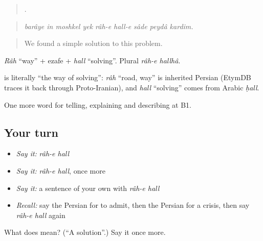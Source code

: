 \begin{quote}
        .
\end{quote}

\begin{quote}
\emph{barâye in moshkel yek râh-e hall-e sâde peydâ kardim.}
\end{quote}

\begin{quote}
We found a simple solution to this problem.
\end{quote}

\emph{Râh} \textquotedblleft{}way\textquotedblright{} + ezafe + \emph{hall} \textquotedblleft{}solving\textquotedblright{}. Plural \emph{râh-e hallhâ}.

\begin{cousinweb}
\textbf{ } is literally \textquotedblleft{}the way of solving\textquotedblright{}: \emph{râh} \textquotedblleft{}road, way\textquotedblright{} is inherited Persian (EtymDB traces it back through Proto-Iranian), and \emph{hall} \textquotedblleft{}solving\textquotedblright{} comes from Arabic \emph{ḥall}.
\end{cousinweb}

\begin{grammarlens}[title={What you've built}]
One more word for telling, explaining and describing at B1.
\end{grammarlens}

\subsection*{Your turn}
\begin{itemize}
\raggedright
  \item \emph{Say it:} \emph{râh-e hall}
  \item \emph{Say it:} \emph{râh-e hall}, once more
  \item \emph{Say it:} a sentence of your own with \emph{râh-e hall}
  \item \emph{Recall:} say the Persian for to admit, then the Persian for a crisis, then say \emph{râh-e hall} again
\end{itemize}

\begin{tcolorbox}[breakable,colback=teal!4,colframe=teal!35!black,title={Before you move on}]
What does   mean? (\textquotedblleft{}A solution\textquotedblright{}.) Say it once more.
\end{tcolorbox}
